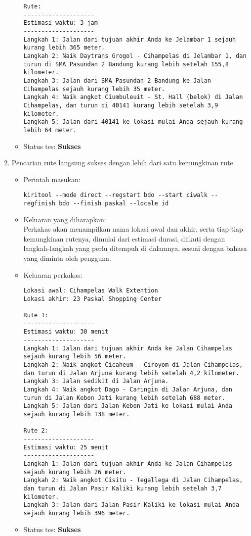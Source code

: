 \begin{enumerate}
\begin{itemize}
\begin{lstlisting}
Rute:
--------------------
Estimasi waktu: 3 jam 
--------------------
Langkah 1: Jalan dari tujuan akhir Anda ke Jelambar 1 sejauh kurang lebih 365 meter.
Langkah 2: Naik Daytrans Grogol - Cihampelas di Jelambar 1, dan turun di SMA Pasundan 2 Bandung kurang lebih setelah 155,8 kilometer.
Langkah 3: Jalan dari SMA Pasundan 2 Bandung ke Jalan Cihampelas sejauh kurang lebih 35 meter.
Langkah 4: Naik angkot Ciumbuleuit - St. Hall (belok) di Jalan Cihampelas, dan turun di 40141 kurang lebih setelah 3,9 kilometer.
Langkah 5: Jalan dari 40141 ke lokasi mulai Anda sejauh kurang lebih 64 meter.
		\end{lstlisting}
		\item Status tes: \textbf{Sukses}
	\end{itemize}
	
	\item Pencarian rute langsung sukses dengan lebih dari satu kemungkinan rute
	\begin{itemize}
		\item Perintah masukan:
		\begin{lstlisting}
kiritool --mode direct --regstart bdo --start ciwalk --regfinish bdo --finish paskal --locale id
		\end{lstlisting}
		\item Keluaran yang diharapkan: \\
		Perkakas akan menampilkan nama lokasi awal dan akhir, serta tiap-tiap kemungkinan rutenya, dimulai dari estimasi durasi, diikuti dengan langkah-langkah yang perlu ditempuh di dalamnya, sesuai dengan bahasa yang diminta oleh pengguna.
		\item Keluaran perkakas:
		\begin{lstlisting}
Lokasi awal: Cihampelas Walk Extention
Lokasi akhir: 23 Paskal Shopping Center

Rute 1:
--------------------
Estimasi waktu: 30 menit 
--------------------
Langkah 1: Jalan dari tujuan akhir Anda ke Jalan Cihampelas sejauh kurang lebih 56 meter.
Langkah 2: Naik angkot Cicaheum - Ciroyom di Jalan Cihampelas, dan turun di Jalan Arjuna kurang lebih setelah 4,2 kilometer.
Langkah 3: Jalan sedikit di Jalan Arjuna.
Langkah 4: Naik angkot Dago - Caringin di Jalan Arjuna, dan turun di Jalan Kebon Jati kurang lebih setelah 688 meter.
Langkah 5: Jalan dari Jalan Kebon Jati ke lokasi mulai Anda sejauh kurang lebih 138 meter.

Rute 2:
--------------------
Estimasi waktu: 25 menit 
--------------------
Langkah 1: Jalan dari tujuan akhir Anda ke Jalan Cihampelas sejauh kurang lebih 26 meter.
Langkah 2: Naik angkot Cisitu - Tegallega di Jalan Cihampelas, dan turun di Jalan Pasir Kaliki kurang lebih setelah 3,7 kilometer.
Langkah 3: Jalan dari Jalan Pasir Kaliki ke lokasi mulai Anda sejauh kurang lebih 396 meter.
		\end{lstlisting}
		\item Status tes: \textbf{Sukses}
	\end{itemize}
	

\end{enumerate}
